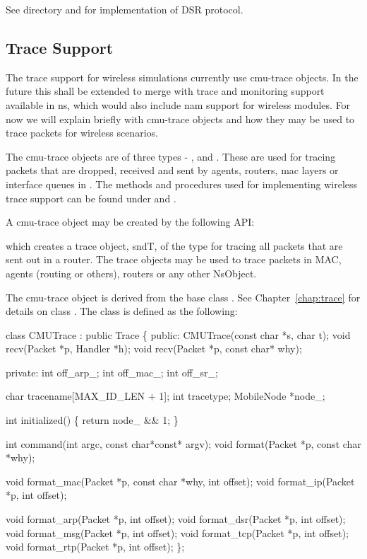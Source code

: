 See  directory and  for implementation of DSR protocol.


\subsection{Trace Support}
\label{sec:mobile-trace}

The trace support for wireless simulations currently use cmu-trace objects. In the future this shall be extended to merge with trace and monitoring support available in ns, which would also include nam support for wireless modules. For now we will explain briefly with cmu-trace objects and how they may be used to trace packets for wireless scenarios. 

The cmu-trace objects are of three types - ,  and . These are used for tracing packets that are dropped, received and sent by agents, routers, mac layers or interface queues in \ns. The methods and procedures used for implementing wireless trace support can be found under  and .

A cmu-trace object may be created by the following API:

which creates a trace object, sndT, of the type  for tracing all packets that are sent out in a router. The trace objects may be used to trace packets in MAC, agents (routing or others), routers or any other NsObject. 

The cmu-trace object  is derived from the base class . See Chapter~\ref{chap:trace} for details on class . The class  is defined as the following:

\begin{program}
class CMUTrace : public Trace \{
public:
	CMUTrace(const char *s, char t);
	void	recv(Packet *p, Handler *h);
	void	recv(Packet *p, const char* why);

private:
	int off_arp_;
	int off_mac_;
	int off_sr_;

	char	tracename[MAX_ID_LEN + 1];
        int     tracetype;
        MobileNode *node_;

        int initialized() \{ return node_ && 1; \}

	int	command(int argc, const char*const* argv);
	void	format(Packet *p, const char *why);

	void	format_mac(Packet *p, const char *why, int offset);
	void	format_ip(Packet *p, int offset);

	void	format_arp(Packet *p, int offset);
	void	format_dsr(Packet *p, int offset);
	void	format_msg(Packet *p, int offset);
	void	format_tcp(Packet *p, int offset);
	void	format_rtp(Packet *p, int offset);
\};
\end{program}

